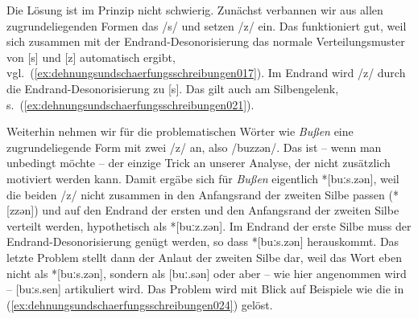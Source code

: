 Die Lösung ist im Prinzip nicht schwierig.
Zunächst verbannen wir aus allen zugrundeliegenden Formen das /s/ und setzen /z/ ein.
Das funktioniert gut, weil sich zusammen mit der Endrand-Desonorisierung das normale Verteilungsmuster von [s] und [z] automatisch ergibt, vgl.\ (\ref{ex:dehnungsundschaerfungsschreibungen017}).
Im Endrand wird /z/ durch die Endrand-Desonorisierung zu [s].
Das gilt auch am Silbengelenk, s.\ (\ref{ex:dehnungsundschaerfungsschreibungen021}).

\begin{exe}
\end{exe}

Weiterhin nehmen wir für die problematischen Wörter wie \textit{Bußen} eine zugrundeliegende Form mit zwei /z/ an, also /buzzən/.
Das ist -- wenn man unbedingt möchte -- der einzige Trick an unserer Analyse, der nicht zusätzlich motiviert werden kann.
Damit ergäbe sich für \textit{Bußen} eigentlich *[buːs.zən], weil die beiden /z/ nicht zusammen in den Anfangsrand der zweiten Silbe passen (*[zzən]) und auf den Endrand der ersten und den Anfangsrand der zweiten Silbe verteilt werden, hypothetisch als *[buːz.zən].
Im Endrand der erste Silbe muss der Endrand-Desonorisierung genügt werden, so dass *[buːs.zən] herauskommt.
Das letzte Problem stellt dann der Anlaut der zweiten Silbe dar, weil das Wort eben nicht als *[buːs.zən], sondern als [buː.sən] oder aber -- wie hier angenommen wird -- [buːs.sen] artikuliert wird.
Das Problem wird mit Blick auf Beispiele wie die in (\ref{ex:dehnungsundschaerfungsschreibungen024}) gelöst.

\begin{exe}
  \ex\label{ex:dehnungsundschaerfungsschreibungen024}
  \begin{xlist}
  \end{xlist}
\end{exe}

